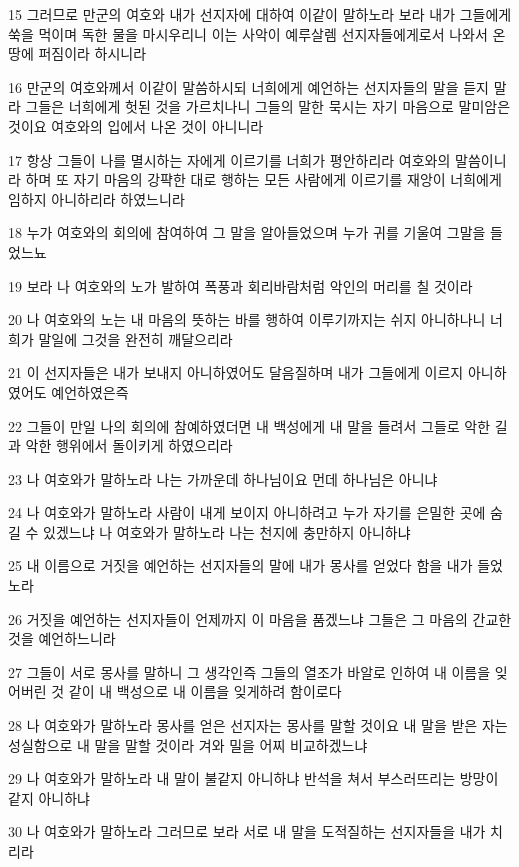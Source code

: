 \par 15 그러므로 만군의 여호와 내가 선지자에 대하여 이같이 말하노라 보라 내가 그들에게 쑥을 먹이며 독한 물을 마시우리니 이는 사악이 예루살렘 선지자들에게로서 나와서 온 땅에 퍼짐이라 하시니라
\par 16 만군의 여호와께서 이같이 말씀하시되 너희에게 예언하는 선지자들의 말을 듣지 말라 그들은 너희에게 헛된 것을 가르치나니 그들의 말한 묵시는 자기 마음으로 말미암은 것이요 여호와의 입에서 나온 것이 아니니라
\par 17 항상 그들이 나를 멸시하는 자에게 이르기를 너희가 평안하리라 여호와의 말씀이니라 하며 또 자기 마음의 강퍅한 대로 행하는 모든 사람에게 이르기를 재앙이 너희에게 임하지 아니하리라 하였느니라
\par 18 누가 여호와의 회의에 참여하여 그 말을 알아들었으며 누가 귀를 기울여 그말을 들었느뇨
\par 19 보라 나 여호와의 노가 발하여 폭풍과 회리바람처럼 악인의 머리를 칠 것이라
\par 20 나 여호와의 노는 내 마음의 뜻하는 바를 행하여 이루기까지는 쉬지 아니하나니 너희가 말일에 그것을 완전히 깨달으리라
\par 21 이 선지자들은 내가 보내지 아니하였어도 달음질하며 내가 그들에게 이르지 아니하였어도 예언하였은즉
\par 22 그들이 만일 나의 회의에 참예하였더면 내 백성에게 내 말을 들려서 그들로 악한 길과 악한 행위에서 돌이키게 하였으리라
\par 23 나 여호와가 말하노라 나는 가까운데 하나님이요 먼데 하나님은 아니냐
\par 24 나 여호와가 말하노라 사람이 내게 보이지 아니하려고 누가 자기를 은밀한 곳에 숨길 수 있겠느냐 나 여호와가 말하노라 나는 천지에 충만하지 아니하냐
\par 25 내 이름으로 거짓을 예언하는 선지자들의 말에 내가 몽사를 얻었다 함을 내가 들었노라
\par 26 거짓을 예언하는 선지자들이 언제까지 이 마음을 품겠느냐 그들은 그 마음의 간교한 것을 예언하느니라
\par 27 그들이 서로 몽사를 말하니 그 생각인즉 그들의 열조가 바알로 인하여 내 이름을 잊어버린 것 같이 내 백성으로 내 이름을 잊게하려 함이로다
\par 28 나 여호와가 말하노라 몽사를 얻은 선지자는 몽사를 말할 것이요 내 말을 받은 자는 성실함으로 내 말을 말할 것이라 겨와 밀을 어찌 비교하겠느냐
\par 29 나 여호와가 말하노라 내 말이 불같지 아니하냐 반석을 쳐서 부스러뜨리는 방망이 같지 아니하냐
\par 30 나 여호와가 말하노라 그러므로 보라 서로 내 말을 도적질하는 선지자들을 내가 치리라
